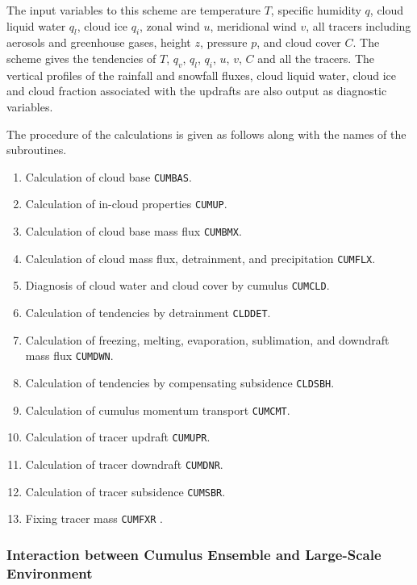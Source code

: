 The input variables to this scheme are temperature \(T\), specific humidity \(q\), cloud liquid water \(q_l\), cloud ice \(q_i\), zonal wind \(u\), meridional wind \(v\), all tracers including
aerosols and greenhouse gases, height \(z\), pressure \(p\), and cloud cover \(C\). The scheme gives the tendencies of \(T\), \(q_v\), \(q_l\), \(q_i\), \(u\), \(v\), \(C\) and all the tracers. The
vertical profiles of the rainfall and snowfall fluxes, cloud liquid water, cloud ice and cloud fraction associated with the updrafts are also output as diagnostic variables.

The procedure of the calculations is given as follows along with the names of the subroutines.

\begin{enumerate}
\def\labelenumi{\arabic{enumi}.}
\tightlist
\item
  Calculation of cloud base \texttt{CUMBAS}.
\item
  Calculation of in-cloud properties \texttt{CUMUP}.
\item
  Calculation of cloud base mass flux \texttt{CUMBMX}.
\item
  Calculation of cloud mass flux, detrainment, and precipitation \texttt{CUMFLX}.
\item
  Diagnosis of cloud water and cloud cover by cumulus \texttt{CUMCLD}.
\item
  Calculation of tendencies by detrainment \texttt{CLDDET}.
\item
  Calculation of freezing, melting, evaporation, sublimation, and downdraft mass flux \texttt{CUMDWN}.
\item
  Calculation of tendencies by compensating subsidence \texttt{CLDSBH}.
\item
  Calculation of cumulus momentum transport \texttt{CUMCMT}.
\item
  Calculation of tracer updraft \texttt{CUMUPR}.
\item
  Calculation of tracer downdraft \texttt{CUMDNR}.
\item
  Calculation of tracer subsidence \texttt{CUMSBR}.
\item
  Fixing tracer mass \texttt{CUMFXR} .
\end{enumerate}

\hypertarget{interaction-between-cumulus-ensemble-and-large-scale-environment}{%
\subsubsection{Interaction between Cumulus Ensemble and Large-Scale Environment}\label{interaction-between-cumulus-ensemble-and-large-scale-environment}}

